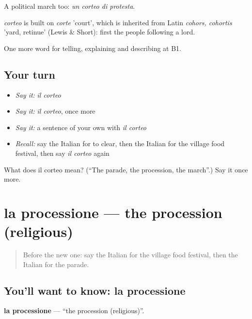 A political march too: \emph{un corteo di protesta}.

\begin{cousinweb}
\emph{corteo} is built on \emph{corte} 'court', which is inherited from Latin \emph{cohors, cohortis} 'yard, retinue' (Lewis \& Short): first the people following a lord.
\end{cousinweb}

\begin{grammarlens}[title={What you've built}]
One more word for telling, explaining and describing at B1.
\end{grammarlens}

\subsection*{Your turn}
\begin{itemize}
\raggedright
  \item \emph{Say it:} \emph{il corteo}
  \item \emph{Say it:} \emph{il corteo}, once more
  \item \emph{Say it:} a sentence of your own with \emph{il corteo}
  \item \emph{Recall:} say the Italian for to clear, then the Italian for the village food festival, then say \emph{il corteo} again
\end{itemize}

\begin{tcolorbox}[breakable,colback=teal!4,colframe=teal!35!black,title={Before you move on}]
What does il corteo mean? (\textquotedblleft{}The parade, the procession, the march\textquotedblright{}.) Say it once more.
\end{tcolorbox}
\section[la processione]{la processione — the procession (religious)}

\label{lesson:IT-C450-processione}



\begin{quote}
Before the new one: say the Italian for the village food festival, then the Italian for the parade.
\end{quote}

\subsection*{You'll want to know: la processione}
\textbf{la processione} — \textquotedblleft{}the procession (religious)\textquotedblright{}.


